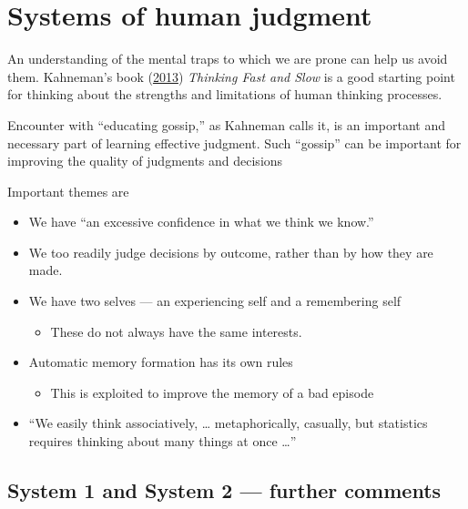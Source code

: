 \documentclass[
  10pt,
  b5paper]{book}
\providecommand{\tightlist}{%
  \setlength{\itemsep}{0pt}\setlength{\parskip}{0pt}}
\begin{document}
\mainmatter

\hypertarget{systems-of-human-judgment}{%
\chapter{Systems of human judgment}\label{systems-of-human-judgment}}

An understanding of the mental traps to which we are prone
can help us avoid them. Kahneman's book (\protect\hyperlink{ref-kahneman_2013}{2013})
\emph{Thinking Fast and Slow} is a good starting point for
thinking about the strengths and limitations of human
thinking processes.

Encounter with ``educating gossip,'' as Kahneman calls it, is an
important and necessary part of learning effective judgment.
Such ``gossip'' can be important for improving the quality
of judgments and decisions

Important themes are

\begin{itemize}
\tightlist
\item
  We have ``an excessive confidence in what we think we know.''
\item
  We too readily judge decisions by outcome, rather than by how they are made.
\item
  We have two selves --- an experiencing self and a remembering self

  \begin{itemize}
  \tightlist
  \item
    These do not always have the same interests.
  \end{itemize}
\item
  Automatic memory formation has its own rules

  \begin{itemize}
  \tightlist
  \item
    This is exploited to improve the memory of a bad episode
  \end{itemize}
\item
  ``We easily think associatively, \ldots{} metaphorically, casually,
  but statistics requires thinking about many things at once \ldots{}''
\end{itemize}

\hypertarget{system-1-and-system-2-further-comments}{%
\section{System 1 and System 2 --- further comments}\label{system-1-and-system-2-further-comments}}
\end{document}

